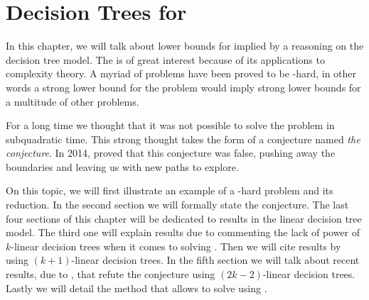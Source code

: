 \chapter{Decision Trees for \threeSUM}
\label{tree:3sum}

In this chapter, we will talk about lower bounds for \threeSUM implied by a
reasoning on the decision tree model. The \threeSUM is of great interest
because of its applications to complexity theory. A myriad of problems have
been proved to be \threeSUM-hard, in other words a strong lower bound for the
\threeSUM problem would imply strong lower bounds for a multitude of other
problems.

For a long time we thought that it was not possible to solve the \threeSUM
problem in subquadratic time. This strong thought takes the form of a
conjecture named \emph{the \threeSUM conjecture}. In 2014, \citet*{gronlund:2014}
proved that this conjecture was false, pushing away the
boundaries and leaving us with new paths to explore.

On this topic, we will first illustrate an example of a \threeSUM-hard problem
and its reduction. In the second section we will formally state the
\threeSUM conjecture. The last four sections of this chapter will be dedicated to results
in the linear decision tree model. The third one will explain results due to
\citet*{erickson:1999} commenting the lack of power of $k$-linear
decision trees when it comes to solving \ksum. Then we will cite
results by \citet*{ailon:2005} using $(k+1)$-linear decision trees.
In the fifth section we will talk about recent results, due to \citet*{gronlund:2014}, that
refute the \threeSUM conjecture using $(2k-2)$-linear decision trees. Lastly
we will detail the method that allows to solve \kLDT using \threeSUM.
